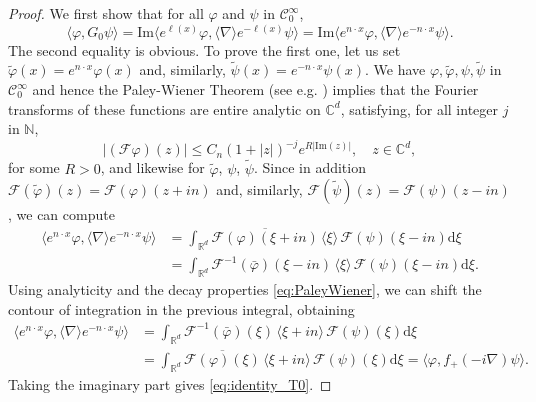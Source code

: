 \documentclass[12pt]{article}
\newcommand{\Tzero}{{G_0}}
\theoremstyle{plain}
\newcommand{\diff}{\mathrm{d}}
\begin{document}
\begin{proof}
We first show that for all $\varphi$ and $\psi$ in $\mathcal{C}_0^\infty$,
\begin{equation}\label{eq:identity_T0}
    \langle\varphi,\Tzero\psi\rangle=\mathrm{Im}\big\langle e^{\ell(x)}\varphi,\langle\nabla\rangle e^{-\ell(x)}\psi\big\rangle=\mathrm{Im}\big\langle e^{n\cdot x}\varphi,\langle\nabla\rangle e^{-n\cdot x}\psi\big\rangle.
\end{equation}
The second equality is obvious. To prove the first one, let us set $\tilde\varphi(x)=e^{n\cdot x}\varphi(x)$ and, similarly, $\tilde \psi(x)=e^{-n\cdot x}\psi(x)$. We have $\varphi,\tilde\varphi,\psi,\tilde\psi$ in $\mathcal{C}_0^\infty$ and hence the Paley-Wiener Theorem (see e.g. \cite[Theorem IX.11]{reed_sim_vol2}) implies that the Fourier transforms of these functions are entire analytic on $\mathbb{C}^d$, satisfying, for all integer $j$ in $\mathbb{N}$,
\begin{equation}\label{eq:PaleyWiener}
    \big |(\mathcal{F}\varphi)(z)\big|\le C_n(1+|z|)^{-j}e^{R|\mathrm{Im}(z)|}, \quad z\in\mathbb{C}^d,
\end{equation}
for some $R>0$, and likewise for $\tilde\varphi$, $\psi$, $\tilde\psi$. Since in addition $\mathcal{F}(\tilde\varphi)(z)=\mathcal{F}(\varphi)(z+in)$ and, similarly, $\mathcal{F}(\tilde\psi)(z)=\mathcal{F}(\psi)(z-in)$, we can compute
\begin{align*}
    \big\langle e^{n\cdot x}\varphi,\langle\nabla\rangle e^{-n\cdot x}\psi\big\rangle&=\int_{\mathbb{R}^d}\overline{\mathcal{F}(\varphi)(\xi+in)}\,\langle\xi\rangle\,\mathcal{F}(\psi)(\xi-in)\diff\xi\\
    &=\int_{\mathbb{R}^d}\mathcal{F}^{-1}(\bar\varphi)(\xi-in)\,\langle\xi\rangle\,\mathcal{F}(\psi)(\xi-in)\diff\xi.
\end{align*}
Using analyticity and the decay properties \eqref{eq:PaleyWiener}, we can shift the contour of integration in the previous integral, obtaining
\begin{align*}
    \big\langle e^{n\cdot x}\varphi,\langle\nabla\rangle e^{-n\cdot x}\psi\big\rangle
    &=\int_{\mathbb{R}^d}\mathcal{F}^{-1}(\bar\varphi)(\xi)\,\langle\xi+in\rangle\,\mathcal{F}(\psi)(\xi)\diff\xi\\
    &=\int_{\mathbb{R}^d}\overline{\mathcal{F}(\varphi)(\xi)}\,\langle\xi+in\rangle\,\mathcal{F}(\psi)(\xi)\diff\xi=\big\langle\varphi,f_+(-i\nabla)\psi\big\rangle.
\end{align*}
Taking the imaginary part gives \eqref{eq:identity_T0}.



\end{proof}
\end{document}
